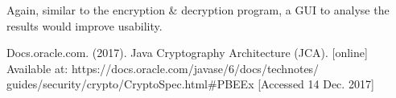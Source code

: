 \documentclass[journal,comsoc]{IEEEtran}
\begin{document}
	Again, similar to the encryption \& decryption program, a GUI to analyse the results would improve usability.
	
	
	\begin{thebibliography}{1}
		
		Docs.oracle.com. (2017). Java Cryptography Architecture (JCA). [online] Available at: https://docs.oracle.com/javase/6/docs/technotes/ guides/security/crypto/CryptoSpec.html\#PBEEx [Accessed 14 Dec. 2017]

	\end{thebibliography}
\end{document}
